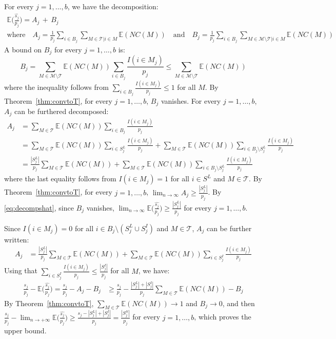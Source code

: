 \documentclass[aos]{imsart}
\theoremstyle{plain}
\newcommand{\E}{\mathbb{E}}
\begin{document}
\begin{supplement}
For every $j=1,\ldots,b$, we have the decomposition:
\begin{gather}\label{eq:decompshat}
    \E\bigg(\frac{\widehat{s_j}}{p_j}\bigg)
   =A_j\,+\, B_j \\
       \text{where} \quad A_j=\frac{1}{p_j}\sum_{i \in B_j}\sum_{M \in \mathcal{T}|i\in M}\E(NC(M)) \quad\text{and}\quad  B_j=\frac{1}{p_j}\sum_{i \in B_j}\sum_{M \in \mathcal{M}\setminus \mathcal{T}|i\in M}\E(NC(M)) \nonumber
\end{gather}
A bound on $B_j$ for every $j=1,\ldots,b$ is:
$$B_j = \sum_{M \in \mathcal{M}\setminus \mathcal{T}}\E(NC(M))\sum_{i \in B_j}\frac{I(i\in M_j)}{p_j}\leq \sum_{M \in \mathcal{M}\setminus \mathcal{T}}\E(NC(M)) $$
where the inequality follows from $\sum_{i \in B_j}\frac{I(i\in M_j)}{p_j}\leq 1$ for all $M$. By Theorem~\ref{thm:convtoT}, for every $j=1,\ldots,b$, $B_j$ vanishes.
For every $j=1,\ldots,b$, $A_j$ can be furthered decomposed:
\begin{align*}
  A_j
   &= \sum_{M \in \mathcal{T}}\E(NC(M))\sum_{i \in B_j}\frac{I(i\in M_j)}{p_j}\\
   &= \sum_{M \in \mathcal{T}}\E(NC(M))\sum_{i \in S^L_j}\frac{I(i\in M_j)}{p_j}+\sum_{M \in \mathcal{T}}\E(NC(M))\sum_{i \in B_j\setminus S^L_j}\frac{I(i\in M_j)}{p_j}\\
   &= \frac{|S^L_j|}{p_j}\sum_{M \in \mathcal{T}}\E(NC(M))+\sum_{M \in \mathcal{T}}\E(NC(M))\sum_{i \in B_j\setminus S^L_j}\frac{I(i\in M_j)}{p_j}
\end{align*}
where the last equality follows from $I(i\in M_j)=1$ for all $i\in S^L$ and $M\in\mathcal{T}$. By  Theorem~\ref{thm:convtoT}, for every $j=1,\ldots,b$, $\lim_{n\to\infty}A_j \geq \frac{|S^L_j|}{p_j}$. By \eqref{eq:decompshat}, since $B_j$ vanishes, $\lim_{n\to\infty}\E\Big(\frac{\widehat{s_j}}{p_j}\Big)\geq \frac{|S^L_j|}{p_j}$ for every $j=1,\ldots,b$.

Since $I(i\in M_j)=0$ for all $i\in B_j\setminus(S^L_j\cup S^I_j)$ and $M\in\mathcal{T}$, $A_j$ can be further written:
\begin{align*}
  A_j
   &= \frac{|S^L_j|}{p_j}\sum_{M \in \mathcal{T}}\E(NC(M))+\sum_{M \in \mathcal{T}}\E(NC(M))\sum_{i \in S^I_j}\frac{I(i\in M_j)}{p_j}
\end{align*}
Using that $\sum_{i \in S^I_j}\frac{I(i\in M_j)}{p_j}\leq \frac{|S^I_j|}{p_j}$ for all $M$, we have:
\begin{align*}
    \frac{s_j}{p_j}-\E\bigg(\frac{\widehat{s_j}}{p_j}\bigg) = \frac{s_j}{p_j}-A_j - B_j
    &\geq \frac{s_j}{p_j}- \frac{|S^L_j|+|S^I_j|}{p_j}\sum_{M \in \mathcal{T}}\E(NC(M)) - B_j
\end{align*}
By Theorem~\ref{thm:convtoT}, $\sum_{M \in \mathcal{T}}\E(NC(M))\to 1$ and $B_j\to 0$, and then $ \frac{s_j}{p_j}-\lim_{n\to+\infty}\E\big(\frac{\widehat{s_j}}{p_j}\big) \geq  \frac{s_j-|S^L_j|+|S^I_j|}{p_j}= \frac{|S^S_j|}{p_j}$ for every $j=1,\ldots,b$, which proves the upper bound.



\end{supplement}
\end{document}
